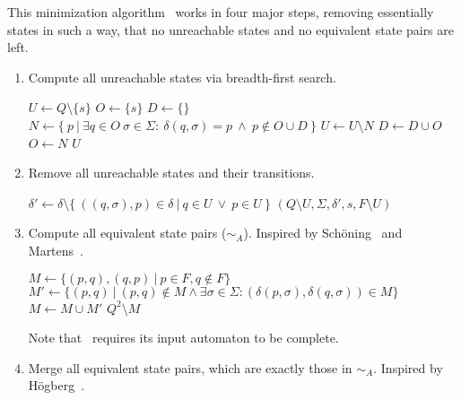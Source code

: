 This minimization algorithm \MinAlg\ works in four major steps, removing essentially states in such a way, that no unreachable states and no equivalent state pairs are left.
\begin{enumerate}
	\item Compute all unreachable states via breadth-first search.
	
	\vspace{0.2cm}
	\begin{algorithmic}[1]
			\State $U \gets Q \setminus \{s\}$	
			\State $O \gets \{s\}$				
			\State $D \gets \{\}$				
				\State $N \gets \{\ p\ | \ \exists q \in O\ \sigma \in \Sigma \colon\ \delta(q, \sigma) = p\ \land\ p \notin O \cup D\ \}$
				\State $U \gets U \setminus N$
				\State $D \gets D \cup O$
				\State $O \gets N$
			\EndWhile
			\State \Return $U$
		\EndFunction
	\end{algorithmic}

	\item Remove all unreachable states and their transitions.
	
	\vspace{0.2cm}
	\begin{algorithmic}[1]
            \State $\delta' \gets \delta \setminus \{\ ((q,\sigma),p)\in\delta\ |\ q\in U\ \lor\ p\in U\ \}$
			\State \Return $(Q \setminus U, \Sigma, \delta', s, F \setminus U)$
		\EndFunction
	\end{algorithmic}

	\item Compute all equivalent state pairs ($\sim_A$). Inspired by Schöning~\cite[p. 46]{Sch01} and Martens~\cite[p. 17]{MS18}.
	
	\vspace{0.2cm}
	\begin{algorithmic}[1]
		 \label{ch:1:minmark}
		\State $M \gets \{ (p,q), (q,p)\ |\ p \in F, q \notin F \}$
		\Do
			\State $M' \gets \{ (p,q)\ |\ (p,q) \notin M \land \exists \sigma \in \Sigma \colon (\delta(p,\sigma), \delta(q,\sigma)) \in M \}$
			\State $M \gets M \cup M'$
		\State \Return $Q^2 \setminus M$
		\EndFunction
	\end{algorithmic}
	Note that \CompDist\ requires its input automaton to be complete. 

	\item Merge all equivalent state pairs, which are exactly those in $\sim_A$. Inspired by Högberg~\cite[p. 10]{HL20}.
	

\end{enumerate}
